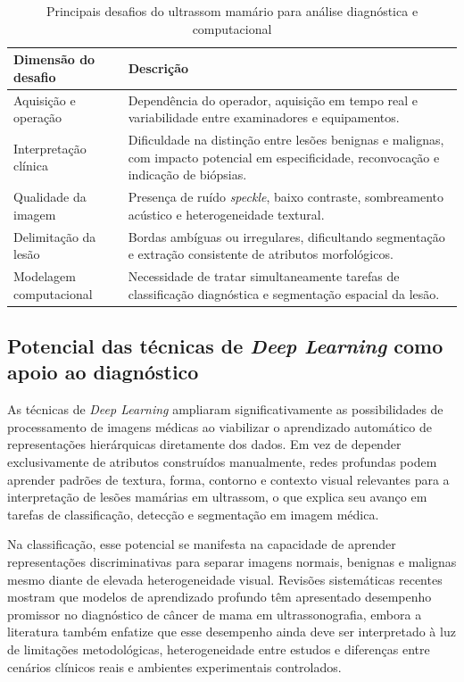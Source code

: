 \documentclass[tcc,capa]{texufpel}
\begin{document}
\begin{table}[htbp]
	\centering
	\caption{Principais desafios do ultrassom mamário para análise diagnóstica e computacional}
	\label{tab:desafios_ultrassom_mamario}
	\begin{tabular}{|p{4.0cm}|p{9.0cm}|}
		\hline
		\textbf{Dimensão do desafio} & \textbf{Descrição} \\ \hline
		Aquisição e operação & Dependência do operador, aquisição em tempo real e variabilidade entre examinadores e equipamentos. \\ \hline
		Interpretação clínica & Dificuldade na distinção entre lesões benignas e malignas, com impacto potencial em especificidade, reconvocação e indicação de biópsias. \\ \hline
		Qualidade da imagem & Presença de ruído \textit{speckle}, baixo contraste, sombreamento acústico e heterogeneidade textural. \\ \hline
		Delimitação da lesão & Bordas ambíguas ou irregulares, dificultando segmentação e extração consistente de atributos morfológicos. \\ \hline
		Modelagem computacional & Necessidade de tratar simultaneamente tarefas de classificação diagnóstica e segmentação espacial da lesão. \\ \hline
	\end{tabular}
\end{table}

\subsection{Potencial das técnicas de \textit{Deep Learning} como apoio ao diagnóstico}

As técnicas de \textit{Deep Learning} ampliaram significativamente as possibilidades de processamento de imagens médicas ao viabilizar o aprendizado automático de representações hierárquicas diretamente dos dados. Em vez de depender exclusivamente de atributos construídos manualmente, redes profundas podem aprender padrões de textura, forma, contorno e contexto visual relevantes para a interpretação de lesões mamárias em ultrassom, o que explica seu avanço em tarefas de classificação, detecção e segmentação em imagem médica. \cite{Liu2025AIBUS,Barragan2021,Guo2018}

Na classificação, esse potencial se manifesta na capacidade de aprender representações discriminativas para separar imagens normais, benignas e malignas mesmo diante de elevada heterogeneidade visual. Revisões sistemáticas recentes mostram que modelos de aprendizado profundo têm apresentado desempenho promissor no diagnóstico de câncer de mama em ultrassonografia, embora a literatura também enfatize que esse desempenho ainda deve ser interpretado à luz de limitações metodológicas, heterogeneidade entre estudos e diferenças entre cenários clínicos reais e ambientes experimentais controlados. \cite{Dan2024,Liu2025AIBUS}
\end{document}
